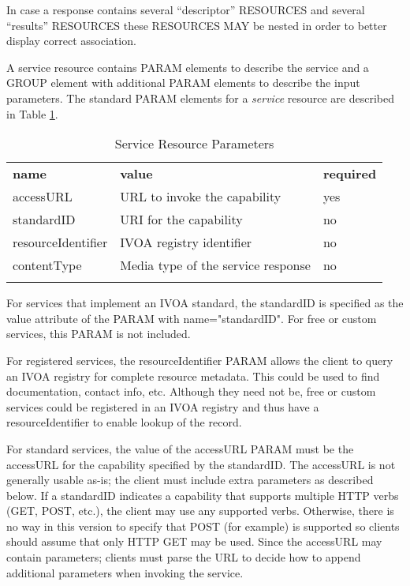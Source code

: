 \documentclass[11pt,a4paper]{ivoa}
\newcommand{\attval}[2]{#1={\allowbreak}{"}#2{"}}
\begin{document}
In case a response contains several “descriptor” RESOURCES  and several “results” RESOURCES these RESOURCES MAY be nested in order to better display correct association.

A service resource contains PARAM elements to describe the service and
a GROUP element with additional PARAM elements to describe the input
parameters.
The standard PARAM elements for a {\em service\/} resource
are described in Table \ref{tab:serviceParams}.
\begin{table}[h]
\begin{center}
\begin{tabular}{|l|l|l|}
\sptablerule
{\bf name}  &  {\bf value}  & {\bf required}  \\
\sptablerule
accessURL           & URL to invoke the capability   &  yes  \\
standardID          & URI for the capability         &  no   \\
resourceIdentifier  & IVOA registry identifier       &  no   \\
contentType	    & Media type of the service response & no \\
\sptablerule
\end{tabular}
\end{center}
\caption{Service Resource Parameters}
\label{tab:serviceParams}
\end{table}

For services that implement an IVOA standard, the standardID is specified
as the value attribute of the PARAM with \attval{name}{standardID}.
For free or custom services, this PARAM is not included.

For registered services, the resourceIdentifier PARAM allows the client
to query an IVOA registry for complete resource metadata. This could be
used to find documentation, contact info, etc. Although they need not be,
free or custom services could be registered in an IVOA registry and thus
have a resourceIdentifier to enable lookup of the record.

For standard services, the value of the accessURL PARAM must be the
accessURL for the capability specified by the standardID. The accessURL
is not generally usable as-is; the client must include extra parameters
as described below. If a standardID indicates a capability that supports
multiple HTTP verbs (GET, POST, etc.), the client may use any supported
verbs. Otherwise, there is no way in this version to specify that POST
(for example) is supported so clients should assume that only HTTP GET
may be used. Since the accessURL may contain parameters; clients must
parse the URL to decide how to append additional parameters when
invoking the service.
\end{document}

